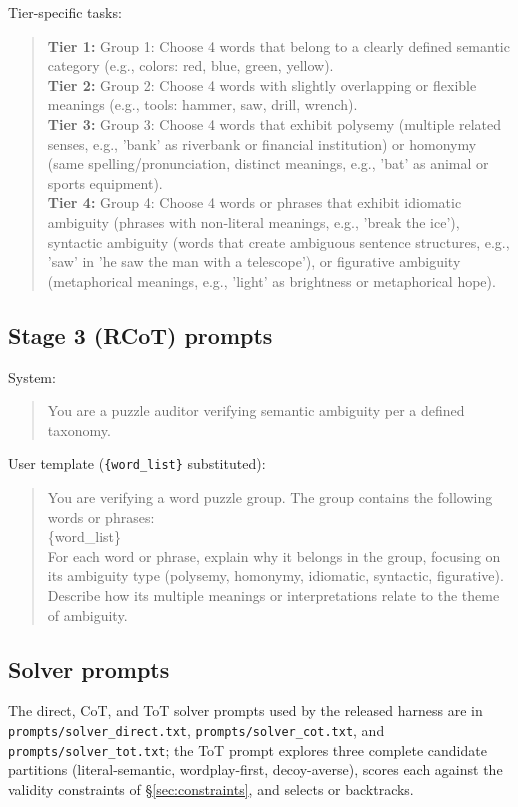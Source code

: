 \documentclass[11pt]{article}
\begin{document}
Tier-specific tasks:
\begin{quote}\small\ttfamily
\textbf{Tier 1:} Group 1: Choose 4 words that belong to a clearly defined semantic category (e.g., colors: red, blue, green, yellow).\\[3pt]
\textbf{Tier 2:} Group 2: Choose 4 words with slightly overlapping or flexible meanings (e.g., tools: hammer, saw, drill, wrench).\\[3pt]
\textbf{Tier 3:} Group 3: Choose 4 words that exhibit polysemy (multiple related senses, e.g., 'bank' as riverbank or financial institution) or homonymy (same spelling/pronunciation, distinct meanings, e.g., 'bat' as animal or sports equipment).\\[3pt]
\textbf{Tier 4:} Group 4: Choose 4 words or phrases that exhibit idiomatic ambiguity (phrases with non-literal meanings, e.g., 'break the ice'), syntactic ambiguity (words that create ambiguous sentence structures, e.g., 'saw' in 'he saw the man with a telescope'), or figurative ambiguity (metaphorical meanings, e.g., 'light' as brightness or metaphorical hope).
\end{quote}

\subsection{Stage 3 (RCoT) prompts}
System:
\begin{quote}\small\ttfamily
You are a puzzle auditor verifying semantic ambiguity per a defined taxonomy.
\end{quote}
User template (\texttt{\{word\_list\}} substituted):
\begin{quote}\small\ttfamily
You are verifying a word puzzle group. The group contains the following words or phrases:\\
\{word\_list\}\\[2pt]
For each word or phrase, explain why it belongs in the group, focusing on its ambiguity type (polysemy, homonymy, idiomatic, syntactic, figurative). Describe how its multiple meanings or interpretations relate to the theme of ambiguity.
\end{quote}

\subsection{Solver prompts}
The direct, CoT, and ToT solver prompts used by the released harness are in \texttt{prompts/solver\_direct.txt}, \texttt{prompts/solver\_cot.txt}, and \texttt{prompts/solver\_tot.txt}; the ToT prompt explores three complete candidate partitions (literal-semantic, wordplay-first, decoy-averse), scores each against the validity constraints of \S\ref{sec:constraints}, and selects or backtracks.
\end{document}
